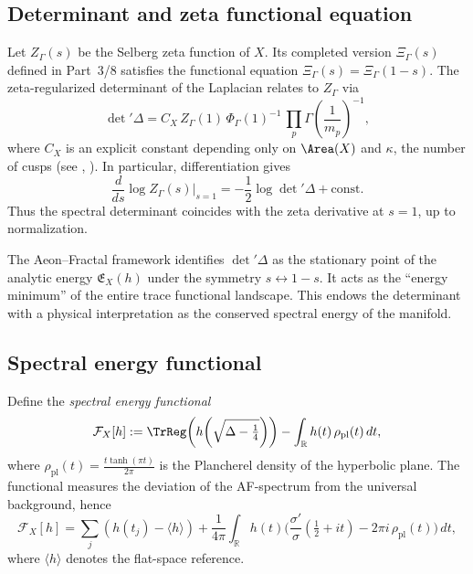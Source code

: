 \subsection{Determinant and zeta functional equation}
\label{subsec:det-func-eq}
\relax\hspace{0pt}

Let $Z_\Gamma(s)$ be the Selberg zeta function of $X$. Its completed
version $\Xi_\Gamma(s)$ defined in Part~3/8 satisfies the functional
equation $\Xi_\Gamma(s)=\Xi_\Gamma(1-s)$. The zeta-regularized
determinant of the Laplacian relates to $Z_\Gamma$ via
\begin{equation}\label{eq:det-selberg}
\det{}'\!\Delta
= C_X\,
Z_\Gamma(1)\,
\Phi_\Gamma(1)^{-1}\,
\prod_{p}\Gamma\!\left(\frac{1}{m_p}\right)^{-1},
\end{equation}
where $C_X$ is an explicit constant depending only on $\Area(X)$ and
$\kappa$, the number of cusps (see \cite{HejhalII}, \cite{Sarnak1983}).
In particular, differentiation gives
\[
\frac{d}{ds}\log Z_\Gamma(s)\Big|_{s=1}
=-\frac{1}{2}\log\det{}'\!\Delta + \mathrm{const.}
\]
Thus the spectral determinant coincides with the zeta derivative at
$s=1$, up to normalization.                                             %

\begin{remark}\label{rem:af-symmetry}
The Aeon–Fractal framework identifies $\det{}'\!\Delta$ as the stationary
point of the analytic energy $\mathfrak{E}_X(h)$ under the symmetry
$s\leftrightarrow 1-s$. It acts as the “energy minimum” of the entire
trace functional landscape. This endows the determinant with a physical
interpretation as the conserved spectral energy of the manifold.         %
\end{remark}

\subsection{Spectral energy functional}
\label{subsec:energy-functional}
\relax\hspace{0pt}

Define the \emph{spectral energy functional}
\[
\mathcal{F}_X[h]
:= \TrReg\!\left(h\!\left(\sqrt{\Delta-\tfrac14}\right)\right)
- \int_{\mathbb{R}} h(t)\,\rho_{\mathrm{pl}}(t)\,dt,
\]
where $\rho_{\mathrm{pl}}(t)=\frac{t\tanh(\pi t)}{2\pi}$ is the
Plancherel density of the hyperbolic plane. The functional measures the
deviation of the AF-spectrum from the universal background, hence
\[
\mathcal{F}_X[h]
= \sum_j (h(t_j)-\langle h\rangle)
+\frac{1}{4\pi}\int_{\mathbb{R}} h(t)
\Big(\frac{\sigma'}{\sigma}\!\left(\tfrac12+it\right)
-2\pi i\,\rho_{\mathrm{pl}}(t)\Big)\,dt,
\]
where $\langle h\rangle$ denotes the flat-space reference.                %

